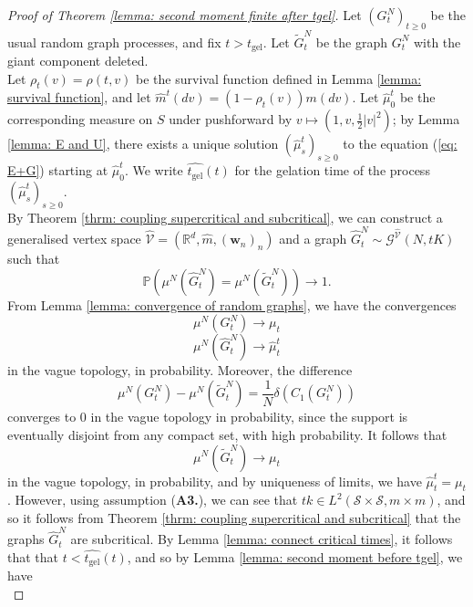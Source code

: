 \begin{proof}[Proof of Theorem \ref{lemma: second moment finite after tgel}] Let $(G^N_t)_{t\geq 0}$ be the usual random graph processes, and fix $t>t_\text{gel}$. Let $\widetilde{G}^N_{t}$ be the graph $G^N_{t}$ with the giant component deleted. \medskip \\ Let $\rho_{t}(v)=\rho(t, v)$ be the survival function defined in Lemma \ref{lemma: survival function}, and let $\widehat{m}^t(dv)=(1-\rho_{t}(v))m(dv)$. Let $\widehat{\mu}^t_0$ be the corresponding measure on $S$ under pushforward by $v\mapsto (1, v, \frac{1}{2}|v|^2)$; by Lemma \ref{lemma: E and U}, there exists a unique solution $(\widehat{\mu}^t_s)_{s\geq 0}$ to the equation (\ref{eq: E+G}) starting at $\widehat{\mu}^t_0$. We write $\widehat{t_\text{gel}}(t)$ for the gelation time of the process $(\widehat{\mu}^t_s)_{s\geq 0}$. \medskip \\ By Theorem \ref{thrm: coupling supercritical and subcritical}, we can construct a generalised vertex space $\widehat{\mathcal{V}}=(\mathbb{R}^d, \widehat{m}, (\mathbf{w}_n)_n)$ and a graph $\widehat{G}^N_{t}\sim \mathcal{G}^{\widehat{\mathcal{V}}}(N,tK)$ such that 
\begin{equation}
    \mathbb{P}\left(\mu^N(\widehat{G}^N_{t})=\mu^N(\widetilde{G}^N_{t})\right)\rightarrow 1.
\end{equation} From Lemma \ref{lemma: convergence of random graphs}, we have the convergences 
\begin{equation}
    \mu^N(G^N_{t})\rightarrow {\mu}_{t}
\end{equation}
\begin{equation}
    \mu^N(\widehat{G}^N_{t})\rightarrow \widehat{\mu}^t_{t}
\end{equation} in the vague topology, in probability.  Moreover, the difference \begin{equation}
    \mu^N(G^N_{t})-\mu^N(\widetilde{G}^N_{t})=\frac{1}{N}\delta(C_1(G^N_{t}))
\end{equation} converges to $0$ in the vague topology in probability, since the support is eventually disjoint from any compact set, with high probability. It follows that \begin{equation}
    \mu^N(\widetilde{G}^N_{t})\rightarrow \mu_{t}
\end{equation} in the vague topology, in probability, and by uniqueness of limits, we have $\widehat{\mu}^t_{t}=\mu_{t}$. However, using assumption (\textbf{A3.}), we can see that $t k\in L^2(\mathcal{S}\times\mathcal{S}, m\times m)$, and so it follows from Theorem \ref{thrm: coupling supercritical and subcritical} that the graphs $\widehat{G}^N_{t}$ are subcritical. By Lemma \ref{lemma: connect critical times}, it follows that that  $t<\widehat{t_\text{gel}}(t)$, and so by Lemma \ref{lemma: second moment before tgel}, we have \begin{equation}

\end{equation}
\end{proof}
